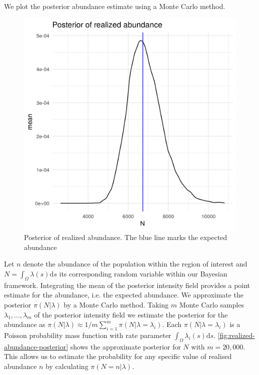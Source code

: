 \documentclass[preprint,12pt]{elsarticle}
\begin{document}
We plot the posterior abundance estimate using a Monte Carlo method.
\begin{figure}[h]
	\begin{center}
		\includegraphics[scale=0.4]{figures/realized_abundance_posterior.png}
		\caption{Posterior of realized abundance.  The blue line marks the expected abundance}
		\label{fig:realized-abundance-posterior}
	\end{center}
\end{figure}
Let $n$ denote the abundance of the population within the region of interest and $N = \int_{\Omega}\lambda(s)\mathrm{d}s$ its corresponding random variable within our Bayesian framework.  Integrating the mean of the posterior intensity field provides a point estimate for the abundance, i.e. the expected abundance.  We approximate the posterior $\pi(N | \lambda)$ by a Monte Carlo method.  Taking $m$ Monte Carlo samples  $\lambda_1, \ldots, \lambda_m$ of the posterior intensity field we estimate the posterior for the abundance as $\pi(N | \lambda) \approx 1 / m \sum_{i=1}^m \pi (N | \lambda = \lambda_i)$. Each $\pi(N | \lambda = \lambda_i)$ is a Poisson probability mass function with rate parameter $\int_{\Omega}\lambda_i(s)\mathrm{d}s$. \autoref{fig:realized-abundance-posterior} shows the approximate posterior for $N$ with $m = 20,000$.  This allows us to estimate the probability for any specific value of realised abundance $n$ by calculating $\pi(N = n | \lambda)$.
  
\end{document}
